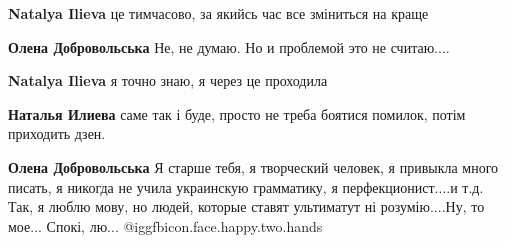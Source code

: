 \begin{itemize}
 
\textbf{Natalya Ilieva} це тимчасово, за якийсь час все зміниться на краще

 
\textbf{Олена Добровольська} Не, не думаю. Но и проблемой это не считаю....

 
\textbf{Natalya Ilieva} я точно знаю, я через це проходила

 
\textbf{Наталья Илиева} саме так і буде, просто не треба боятися помилок, потім приходить дзен.

 
\textbf{Олена Добровольська} Я старше тебя, я творческий человек, я привыкла много писать, я никогда не учила украинскую грамматику, я перфекционист....и т.д. Так, я люблю мову, но людей, которые ставят ультиматут ні розумію....Ну, то мое... Спокі, лю...  
@igg{fbicon.face.happy.two.hands} 

\end{itemize}

 

